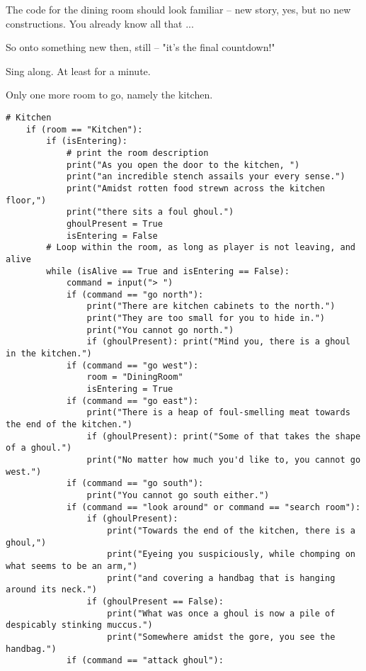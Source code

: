 The code for the dining room should look familiar -- new story, yes, but no new constructions. You already know all that ... 

So onto something new then, still -- "it's the final countdown!" 

\begin{Exe} Sing along. At least for a minute. \end{Exe}

Only one more room to go, namely the kitchen. 

\begin{lstlisting}[firstnumber=last]
    # Kitchen
    if (room == "Kitchen"):
        if (isEntering):
            # print the room description
            print("As you open the door to the kitchen, ")
            print("an incredible stench assails your every sense.")
            print("Amidst rotten food strewn across the kitchen floor,")
            print("there sits a foul ghoul.")
            ghoulPresent = True
            isEntering = False
        # Loop within the room, as long as player is not leaving, and alive
        while (isAlive == True and isEntering == False):
            command = input("> ")
            if (command == "go north"):
                print("There are kitchen cabinets to the north.")
                print("They are too small for you to hide in.")
                print("You cannot go north.")
                if (ghoulPresent): print("Mind you, there is a ghoul in the kitchen.")
            if (command == "go west"):
                room = "DiningRoom"
                isEntering = True
            if (command == "go east"):
                print("There is a heap of foul-smelling meat towards the end of the kitchen.")
                if (ghoulPresent): print("Some of that takes the shape of a ghoul.")
                print("No matter how much you'd like to, you cannot go west.")
            if (command == "go south"):
                print("You cannot go south either.")
            if (command == "look around" or command == "search room"):
                if (ghoulPresent):
                    print("Towards the end of the kitchen, there is a ghoul,")
                    print("Eyeing you suspiciously, while chomping on what seems to be an arm,")
                    print("and covering a handbag that is hanging around its neck.")
                if (ghoulPresent == False):
                    print("What was once a ghoul is now a pile of despicably stinking muccus.")
                    print("Somewhere amidst the gore, you see the handbag.")
            if (command == "attack ghoul"):

\end{lstlisting}
